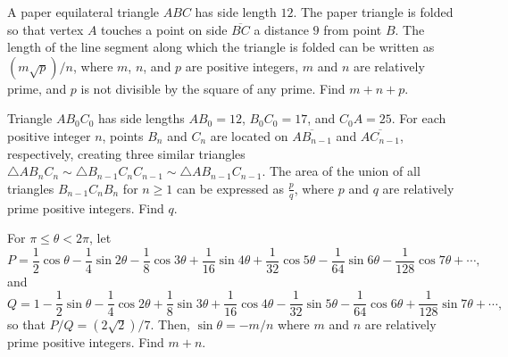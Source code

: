 \begin{question}[name={2013 AIME I, \href{https://artofproblemsolving.com/community/c4p2969819}{Problem 9}}]
	A paper equilateral triangle $ABC$ has side length $12$. The paper triangle is folded so that vertex $A$ touches a point on side $\overline{BC}$ a distance $9$ from point $B$. The length of the line segment along which the triangle is folded can be written as $(m\sqrt{p})/{n}$, where $m$, $n$, and $p$ are positive integers, $m$ and $n$ are relatively prime, and $p$ is not divisible by the square of any prime. Find $m+n+p$.
\end{question}


%	













\begin{question}[name={2013 AIME I, \href{https://artofproblemsolving.com/community/c4p2969816}{Problem 13}}]
	Triangle $AB_0C_0$ has side lengths $AB_0 = 12$, $B_0C_0 = 17$, and $C_0A = 25$. For each positive integer $n$, points $B_n$ and $C_n$ are located on $\overline{AB_{n-1}}$ and $\overline{AC_{n-1}}$, respectively, creating three similar triangles $\triangle AB_nC_n \sim \triangle B_{n-1}C_nC_{n-1} \sim \triangle AB_{n-1}C_{n-1}$. The area of the union of all triangles $B_{n-1}C_nB_n$ for $n\geq1$ can be expressed as $\tfrac pq$, where $p$ and $q$ are relatively prime positive integers. Find $q$.	
\end{question}


%	













\begin{question}[name={2013 AIME I, \href{https://artofproblemsolving.com/community/c4p2969813}{Problem 14}}]
	For $\pi\leq\theta<2\pi$, let
	\[ P=\dfrac12\cos\theta-\dfrac14\sin2\theta-\dfrac18\cos3\theta+\dfrac1{16}\sin4\theta+\dfrac1{32}\cos5\theta-\dfrac1{64}\sin6\theta-\dfrac1{128}\cos7\theta+\cdots,
	\]and
	\[ Q=1-\dfrac12\sin\theta-\dfrac14\cos2\theta+\dfrac1{8}\sin3\theta+\dfrac1{16}\cos4\theta-\dfrac1{32}\sin5\theta-\dfrac1{64}\cos6\theta+\dfrac1{128}\sin7\theta
	+\cdots, \]so that $ P/Q = (2\sqrt2)/7$. Then, $\sin\theta = - m/n$ where $m$ and $n$ are relatively prime positive integers. Find $m+n$.
\end{question}


